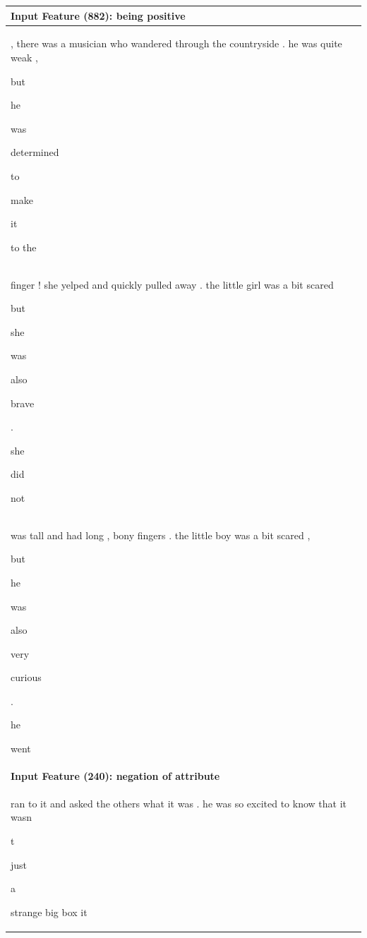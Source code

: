 \documentclass{article} %
\begin{document}
\begin{table}[h]
\begin{tabular}{|l|}
\hline
\hline
\normalsize \textbf{Input Feature (882): being positive} \\
\hline
, there was a musician who wandered through the countryside . he was quite weak , \colorbox{rgb,255:red,204;green,226;blue,239}{\strut  but} \colorbox{rgb,255:red,106;green,139;blue,178}{\strut  he} \colorbox{rgb,255:red,106;green,130;blue,166}{\strut  was} \colorbox{rgb,255:red,128;green,176;blue,214}{\strut  determined} \colorbox{rgb,255:red,165;green,205;blue,229}{\strut  to} \colorbox{rgb,255:red,202;green,225;blue,238}{\strut  make} \colorbox{rgb,255:red,227;green,237;blue,247}{\strut  it} to the \\ 
\hline 

finger ! she yelped and quickly pulled away . the little girl was a bit scared \colorbox{rgb,255:red,223;green,235;blue,246}{\strut  but} \colorbox{rgb,255:red,113;green,159;blue,202}{\strut  she} \colorbox{rgb,255:red,106;green,130;blue,166}{\strut  was} \colorbox{rgb,255:red,124;green,172;blue,211}{\strut  also} \colorbox{rgb,255:red,129;green,177;blue,214}{\strut  brave} \colorbox{rgb,255:red,201;green,225;blue,238}{\strut  .} \colorbox{rgb,255:red,207;green,227;blue,240}{\strut  she} \colorbox{rgb,255:red,207;green,227;blue,240}{\strut  did} \colorbox{rgb,255:red,205;green,226;blue,240}{\strut  not} \\ 
\hline 

was tall and had long , bony fingers . the little boy was a bit scared , \colorbox{rgb,255:red,219;green,232;blue,244}{\strut  but} \colorbox{rgb,255:red,109;green,153;blue,198}{\strut  he} \colorbox{rgb,255:red,106;green,130;blue,166}{\strut  was} \colorbox{rgb,255:red,120;green,168;blue,208}{\strut  also} \colorbox{rgb,255:red,117;green,165;blue,206}{\strut  very} \colorbox{rgb,255:red,139;green,187;blue,219}{\strut  curious} \colorbox{rgb,255:red,193;green,221;blue,235}{\strut  .} \colorbox{rgb,255:red,213;green,229;blue,242}{\strut  he} \colorbox{rgb,255:red,231;green,240;blue,248}{\strut  went} \\ 
\hline 

\hline
\hline
\normalsize \textbf{Input Feature (240): negation of attribute} \\
\hline
ran to it and asked the others what it was . he was so excited to know that it wasn \colorbox{rgb,255:red,106;green,130;blue,166}{\strut t} \colorbox{rgb,255:red,188;green,218;blue,235}{\strut  just} \colorbox{rgb,255:red,225;green,236;blue,246}{\strut  a} strange big box it \\ 
\hline 


\end{tabular}
\end{table}
\end{document}
